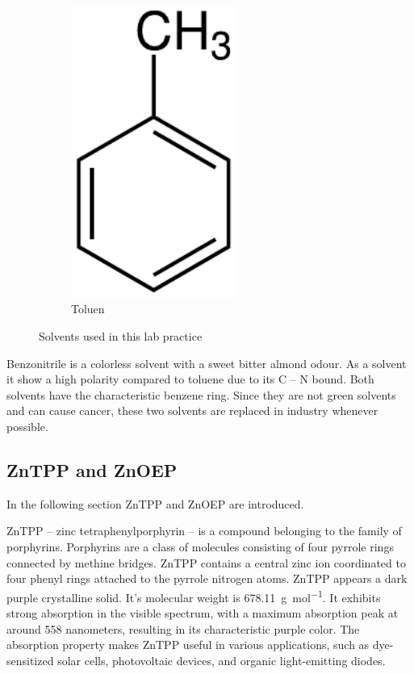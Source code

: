 \begin{figure}[h]
\begin{subfigure}[b]{0.3\textwidth}
      \includegraphics[width = 0.6\textwidth]{Bilder/Grundlagen/Toluen.pdf}      
      \caption{Toluen}
      \label{fig:Tol}
    \end{subfigure}
    \caption{Solvents used in this lab practice}
    \label{fig:Solvents}
\end{figure}

Benzonitrile is a colorless solvent with a sweet bitter almond odour. As a solvent it show a high polarity compared to toluene due to its C -- N bound. 
Both solvents have the characteristic benzene ring. Since they are not green solvents and can cause cancer, these two solvents are replaced in industry whenever possible. 

\subsection{ZnTPP and ZnOEP}
\label{subsec:ZnTPPZnOEP}

In the following section ZnTPP and ZnOEP are introduced.

ZnTPP -- zinc tetraphenylporphyrin -- is a compound belonging to the family of porphyrins. Porphyrins are a class of 
molecules consisting of four pyrrole rings connected by methine bridges. ZnTPP contains a central zinc ion coordinated to four phenyl rings attached
to the pyrrole nitrogen atoms.
ZnTPP appears a dark purple crystalline solid. It's molecular weight is \SI{678.11}{\gram\per\mol}. It exhibits strong absorption in the visible spectrum, with a maximum absorption peak at around 558 nanometers, resulting in its characteristic purple color.
The absorption property makes ZnTPP useful in various applications, such as dye-sensitized solar cells, photovoltaic devices, and organic light-emitting
diodes. 


